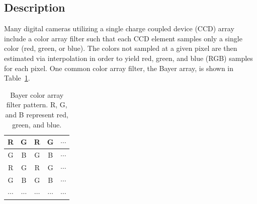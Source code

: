 \documentclass{report}
\begin{document}
\subsection{Description}

Many digital cameras utilizing a single charge coupled device (CCD) array
include a color array filter such that each CCD element samples only a single
color (red, green, or blue).
The colors not sampled at a given pixel are then estimated via interpolation
in order to yield red, green, and blue (RGB) samples for each pixel.
One common color array filter, the Bayer array, is shown in Table~\ref{tbl:bayer_pattern}.

\begin{table}[t]
    \begin{center}
    \caption{Bayer color array filter pattern. R, G, and B represent red, green, and blue.}
    \begin{tabular}{|c|c|c|c|c|}
        \hline
        R & G & R & G & $\cdots$ \\ \hline
        G & B & G & B & $\cdots$ \\ \hline
        R & G & R & G & $\cdots$ \\ \hline
        G & B & G & B & $\cdots$ \\ \hline
        $\cdots$ & $\cdots$ & $\cdots$ & $\cdots$ & $\cdots$ \\ \hline
    \end{tabular}
    \label{tbl:bayer_pattern}
    \end{center}
\end{table}
    

\end{document}
